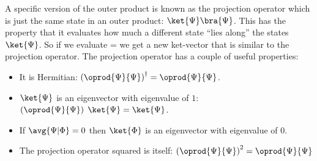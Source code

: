 A specific version of the outer product is known as the projection operator which is just the same state in an outer product: $\ket{\Psi}\bra{\Psi}$. This has the property that it evaluates how much a different state ``lies along'' the states $\ket{\Psi}$. So if we evaluate 
\beq
\oprod{\Psi}{\Psi}\;  = \ket{\Psi}
\eeq
we get a new ket-vector that is similar to the projection operator. The projection operator has a couple of useful properties:
\begin{itemize}
\item It is Hermitian: $\left(\oprod{\Psi}{\Psi}\right)^\dagger = \oprod{\Psi}{\Psi}$.
\item $\ket{\Psi}$ is an eigenvector with eigenvalue of $1$: $\left(\oprod{\Psi}{\Psi}\right)\;\ket{\Psi} = \ket{\Psi}$.
\item If $\avg{\Psi|\Phi}=0$ then $\ket{\Phi}$ is an eigenvector with eigenvalue of $0$.
\item The projection operator squared is itself: $\left(\oprod{\Psi}{\Psi}\right)^2=\oprod{\Psi}{\Psi}$
\end{itemize}

